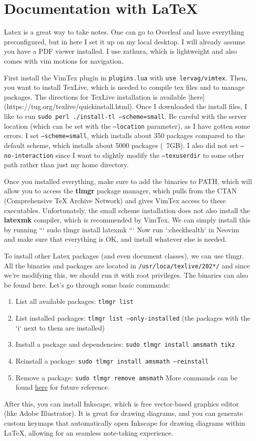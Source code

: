 \section{Documentation with LaTeX} 

  Latex is a great way to take notes. One can go to Overleaf and have everything preconfigured, but in here I set it up on my local desktop. I will already assume you have a PDF viewer installed. I use zathura, which is lightweight and also comes with vim motions for navigation. 

  First install the VimTex plugin in \texttt{plugins.lua} with \texttt{use lervag/vimtex}. Then, you want to install TexLive, which is needed to compile tex files and to manage packages. The directions for TexLive installation is available [here](https://tug.org/texlive/quickinstall.html). Once I downloaded the install files, I like to run \texttt{sudo perl ./install-tl --scheme=small}. Be careful with the server location (which can be set with the \texttt{--location} parameter), as I have gotten some errors. I set \texttt{--scheme=small}, which installs about 350 packages compared to the default scheme, which installs about 5000 packages (~7GB). I also did not set \texttt{--no-interaction} since I want to slightly modify the \texttt{--texuserdir} to some other path rather than just my home directory. 

  Once you installed everything, make sure to add the binaries to PATH, which will allow you to access the \textbf{tlmgr} package manager, which pulls from the CTAN (Comprehensive TeX Archive Network) and gives VimTex access to these executables. Unfortunately, the small scheme installation does not also install the \textbf{latexmk} compiler, which is recommended by VimTex. We can simply install this by running 
  ```
  sudo tlmgr install latexmk
  ```
  Now run `:checkhealth` in Neovim and make sure that everything is OK, and install whatever else is needed. 


  To install other Latex packages (and even document classes), we can use tlmgr. All the binaries and packages are located in \texttt{/usr/loca/texlive/202*/} and since we're modifying this, we should run it with root privileges. The binaries can also be found here. Let's go through some basic commands: 
  \begin{enumerate}
    \item List all available packages: \texttt{tlmgr list}
    \item List installed packages: \texttt{tlmgr list --only-installed} (the packages with the `i` next to them are installed)
    \item Install a package and dependencies: \texttt{sudo tlmgr install amsmath tikz} 
    \item Reinstall a package: \texttt{sudo tlmgr install amsmath --reinstall}
    \item Remove a package: \texttt{sudo tlmgr remove amsmath} 
  More commands can be found \href{http://tug.ctan.org/info/tlmgrbasics/doc/tlmgr.pdf}{here} for future reference.  
  \end{enumerate}

  After this, you can install Inkscape, which is free vector-based graphics editor (like Adobe Illustrator). It is great for drawing diagrams, and you can generate custom keymaps that automatically open Inkscape for drawing diagrams within LaTeX, allowing for an seamless note-taking experience.  

